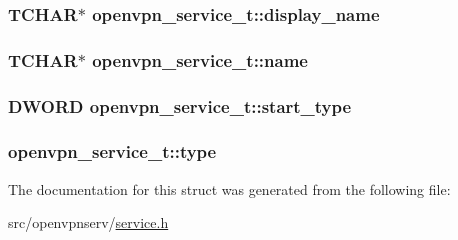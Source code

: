 \subsubsection[{display\+\_\+name}]{\setlength{\rightskip}{0pt plus 5cm}T\+C\+H\+A\+R$\ast$ openvpn\+\_\+service\+\_\+t\+::display\+\_\+name}\label{structopenvpn__service__t_a3698084bf69f74c972583de6e7aebb18}
\hypertarget{structopenvpn__service__t_a8656948a912ca64eb085a7f04044250c}{}
\subsubsection[{name}]{\setlength{\rightskip}{0pt plus 5cm}T\+C\+H\+A\+R$\ast$ openvpn\+\_\+service\+\_\+t\+::name}\label{structopenvpn__service__t_a8656948a912ca64eb085a7f04044250c}
\hypertarget{structopenvpn__service__t_a3a1e4c37c8390d3607f7052474be0d1e}{}
\subsubsection[{start\+\_\+type}]{\setlength{\rightskip}{0pt plus 5cm}D\+W\+O\+R\+D openvpn\+\_\+service\+\_\+t\+::start\+\_\+type}\label{structopenvpn__service__t_a3a1e4c37c8390d3607f7052474be0d1e}
\hypertarget{structopenvpn__service__t_acb7dfd50530ccaa9e9b2d8adc187c851}{}
\subsubsection[{type}]{ openvpn\+\_\+service\+\_\+t\+::type}\label{structopenvpn__service__t_acb7dfd50530ccaa9e9b2d8adc187c851}


The documentation for this struct was generated from the following file\+:\begin{DoxyCompactItemize}
\item 
src/openvpnserv/\hyperlink{service_8h}{service.\+h}\end{DoxyCompactItemize}

